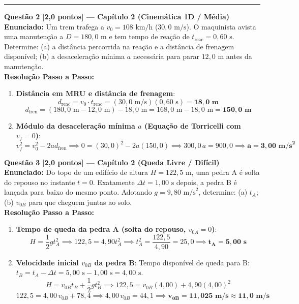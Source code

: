 \documentclass[10pt,a4paper]{article}
\begin{document}
\vspace{6mm}
\hrule
\vspace{6mm}

\noindent\textbf{\large Questão 2} \hfill \textbf{[2,0 pontos] --- Capítulo 2 (Cinemática 1D / Média)}\\[1.5mm]
\textbf{Enunciado:} Um trem trafega a $v_0 = 108\text{ km/h}$ ($30,0\text{ m/s}$). O maquinista avista uma manutenção a $D = 180,0\text{ m}$ e tem tempo de reação de $t_{\text{reac}} = 0,60\text{ s}$. Determine: (a) a distância percorrida na reação e a distância de frenagem disponível; (b) a desaceleração mínima $a$ necessária para parar $12,0\text{ m}$ antes da manutenção.\\[2mm]
\textbf{Resolução Passo a Passo:}
\begin{enumerate}[label=\alph*),itemsep=3pt,topsep=2pt]
    \item \textbf{Distância em MRU e distância de frenagem}:
    $$d_{\text{reac}} = v_0 \cdot t_{\text{reac}} = (30,0\text{ m/s})(0,60\text{ s}) = \mathbf{18,0\text{ m}}$$
    $$d_{\text{fren}} = (180,0\text{ m} - 12,0\text{ m}) - 18,0\text{ m} = 168,0\text{ m} - 18,0\text{ m} = \mathbf{150,0\text{ m}}$$

    \item \textbf{Módulo da desaceleração mínima $a$ (Equação de Torricelli com $v_f = 0$)}:
    $$v_f^2 = v_0^2 - 2 a d_{\text{fren}} \implies 0 = (30,0)^2 - 2 a (150,0) \implies 300,0 \, a = 900,0 \implies \mathbf{a = 3,00\text{ m/s}^2}$$
\end{enumerate}

\newpage

\noindent\textbf{\large Questão 3} \hfill \textbf{[2,0 pontos] --- Capítulo 2 (Queda Livre / Difícil)}\\[1.5mm]
\textbf{Enunciado:} Do topo de um edifício de altura $H = 122,5\text{ m}$, uma pedra A é solta do repouso no instante $t = 0$. Exatamente $\Delta t = 1,00\text{ s}$ depois, a pedra B é lançada para baixo do mesmo ponto. Adotando $g = 9,80\text{ m/s}^2$, determine: (a) $t_A$; (b) $v_{0B}$ para que cheguem juntas ao solo.\\[2mm]
\textbf{Resolução Passo a Passo:}
\begin{enumerate}[label=\alph*),itemsep=3pt,topsep=2pt]
    \item \textbf{Tempo de queda da pedra A (solta do repouso, $v_{0A} = 0$)}:
    $$H = \frac{1}{2} g t_A^2 \implies 122,5 = 4,90 t_A^2 \implies t_A^2 = \frac{122,5}{4,90} = 25,0 \implies \mathbf{t_A = 5,00\text{ s}}$$

    \item \textbf{Velocidade inicial $v_{0B}$ da pedra B}:
    Tempo disponível de queda para B: $t_B = t_A - \Delta t = 5,00\text{ s} - 1,00\text{ s} = 4,00\text{ s}$.
    $$H = v_{0B} t_B + \frac{1}{2} g t_B^2 \implies 122,5 = v_{0B} (4,00) + 4,90 (4,00)^2$$
    $$122,5 = 4,00 \, v_{0B} + 78,4 \implies 4,00 \, v_{0B} = 44,1 \implies \mathbf{v_{0B} = 11,025\text{ m/s} \approx 11,0\text{ m/s}}$$
\end{enumerate}
\end{document}
